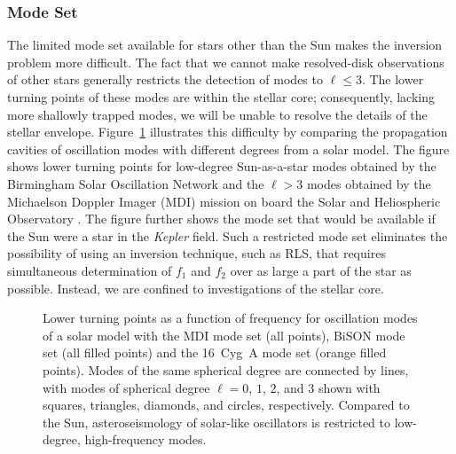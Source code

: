 \subsubsection*{Mode Set}
The limited mode set available for stars other than the Sun makes the inversion problem more difficult. 
The fact that we cannot make resolved-disk observations of other stars generally restricts the detection of modes to ${\ell \le 3}$. 
The lower turning points of these modes are within the stellar core; consequently, lacking more shallowly trapped modes, we will be unable to resolve the details of the stellar envelope. 
Figure~\ref{fig:turning-points} illustrates this difficulty by comparing the propagation cavities of oscillation modes with different degrees from a solar model. 
%
%
%
%
%
%
%
The figure shows lower turning points for low-degree Sun-as-a-star modes obtained by the Birmingham Solar Oscillation Network \citep[BiSON;][]{2014MNRAS.439.2025D} and the ${\ell > 3}$ modes obtained by the Michaelson Doppler Imager (MDI) mission on board the Solar and Heliospheric Observatory \citep[SOHO,][]{1997SoPh..175..287R}. 
The figure further shows the mode set that would be available if the Sun were a star in the {\it Kepler} field. 
Such a restricted mode set eliminates the possibility of using an inversion technique, such as RLS, that requires simultaneous determination of $f_1$ and $f_2$ over as large a part of the star as possible. 
Instead, we are confined to investigations of the stellar core. 


\begin{figure}
    \centering
    \caption[Lower turning points of a solar model]{Lower turning points as a function of frequency for oscillation modes of a solar model with the MDI mode set (all points), BiSON mode set (all filled points) and the 16~Cyg~A mode set  (\textcolor{turn-orange}{orange} filled points). 
    Modes of the same spherical degree are connected by lines, with modes of spherical degree ${\ell = 0}$, $1$, $2$, and $3$ shown with squares, triangles, diamonds, and circles, respectively. Compared to the Sun, asteroseismology of solar-like oscillators is restricted to low-degree, high-frequency modes. 
    \label{fig:turning-points}} 
\end{figure}


